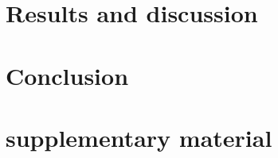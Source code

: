 \documentclass[aip,jcp,amsmath]{revtex4-1}
\begin{document}
\section{Results and discussion}\label{Sec:results}

\section{Conclusion}\label{Sec:Conclusion}

\section*{supplementary material}

\begin{acknowledgments}  
  
\end{acknowledgments}


\end{document}
